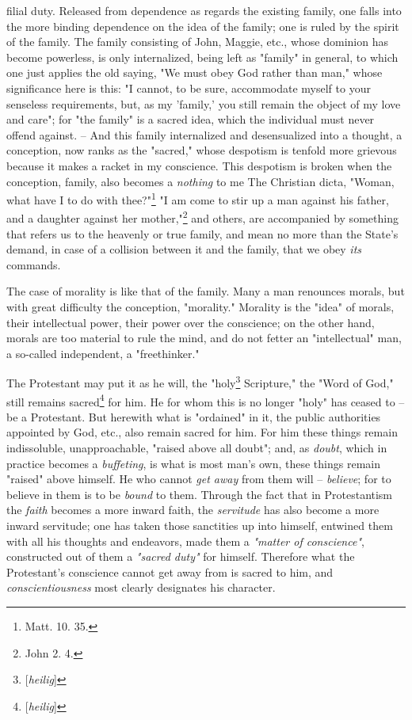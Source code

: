 filial duty. Released from dependence as regards the existing family, one 
falls into the more binding dependence on the idea of the family; one is ruled 
by the spirit of the family. The family consisting of John, Maggie, etc., 
whose dominion has become powerless, is only internalized, being left as 
"{}family"{} in general, to which one just applies the old saying, "{}We must 
obey God rather than man,"{} whose significance here is this: "{}I cannot, to 
be sure, accommodate myself to your senseless requirements, but, as my 
'family,' you still remain the object of my love and care"{}; for "{}the 
family"{} is a sacred idea, which the individual must never offend against. -- 
And this family internalized and desensualized into a thought, a conception, 
now ranks as the "{}sacred,"{} whose despotism is tenfold more grievous 
because it makes a racket in my conscience. This despotism is broken when the 
conception, family, also becomes a \textit{nothing} to me The Christian dicta, 
"{}Woman, what have I to do with thee?"{}\footnote{Matt. 10. 35.} "{}I am come 
to stir up a man against his father, and a daughter against her 
mother,"{}\footnote{John 2. 4.} and others, are accompanied by something that 
refers us to the heavenly or true family, and mean no more than the State's 
demand, in case of a collision between it and the family, that we obey 
\textit{its} commands.

The case of morality is like that of the family. Many a man renounces morals, 
but with great difficulty the conception, "{}morality."{} Morality is the 
"{}idea"{} of morals, their intellectual power, their power over the 
conscience; on the other hand, morals are too material to rule the mind, and 
do not fetter an "{}intellectual"{} man, a so-called independent, a 
"{}freethinker."{}

The Protestant may put it as he will, the "{}holy\footnote{[\textit{heilig}]} 
Scripture,"{} the "{}Word of God,"{} still remains 
sacred\footnote{[\textit{heilig}]} for him. He for whom this is no longer 
"{}holy"{} has ceased to -- be a Protestant. But herewith what is 
"{}ordained"{} in it, the public authorities appointed by God, etc., also 
remain sacred for him. For him these things remain indissoluble, 
unapproachable, "{}raised above all doubt"{}; and, as \textit{doubt}, which in 
practice becomes a \textit{buffeting}, is what is most man's own, these things 
remain "{}raised"{} above himself. He who cannot \textit{get away} from them 
will -- \textit{believe}; for to believe in them is to be \textit{bound} to 
them. Through the fact that in Protestantism the \textit{faith} becomes a more 
inward faith, the \textit{servitude} has also become a more inward servitude; 
one has taken those sanctities up into himself, entwined them with all his 
thoughts and endeavors, made them a \textit{"{}matter of conscience"{}}, 
constructed out of them a \textit{"{}sacred duty"{}} for himself. Therefore 
what the Protestant's conscience cannot get away from is sacred to him, and 
\textit{conscientiousness} most clearly designates his character.


